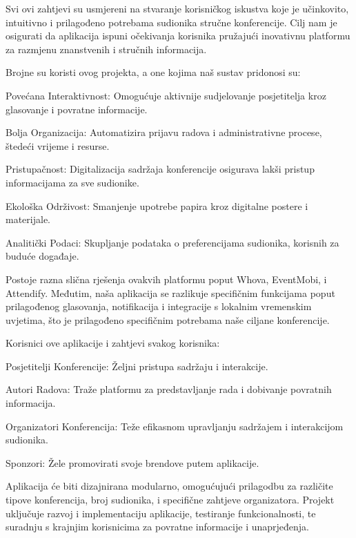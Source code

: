 		Svi ovi zahtjevi su usmjereni na stvaranje korisničkog iskustva koje je učinkovito, intuitivno i prilagođeno potrebama sudionika stručne konferencije. Cilj nam je osigurati da aplikacija ispuni očekivanja korisnika pružajući inovativnu platformu za razmjenu znanstvenih i stručnih informacija.
		
		Brojne su koristi ovog projekta, a one kojima naš sustav pridonosi su: 
		
		\begin{packed_item}
			\item Povećana Interaktivnost: Omogućuje aktivnije sudjelovanje posjetitelja kroz glasovanje i povratne informacije.
			\item Bolja Organizacija: Automatizira prijavu radova i administrativne procese, štedeći vrijeme i resurse.
			\item Pristupačnost: Digitalizacija sadržaja konferencije osigurava lakši pristup informacijama za sve sudionike.
			\item Ekološka Održivost: Smanjenje upotrebe papira kroz digitalne postere i materijale.
			\item Analitički Podaci: Skupljanje podataka o preferencijama sudionika, korisnih za buduće događaje.
		\end{packed_item}

		Postoje razna slična rješenja ovakvih platformu poput Whova, EventMobi, i Attendify. Međutim, naša aplikacija se razlikuje specifičnim funkcijama poput prilagođenog glasovanja, notifikacija i integracije s lokalnim vremenskim uvjetima, što je prilagođeno specifičnim potrebama naše ciljane konferencije.
		
		Korisnici ove aplikacije i zahtjevi svakog korisnika:
		\begin{packed_item}
			\item Posjetitelji Konferencije: Željni pristupa sadržaju i interakcije.
			\item Autori Radova: Traže platformu za predstavljanje rada i dobivanje povratnih informacija.
			\item Organizatori Konferencija: Teže efikasnom upravljanju sadržajem i interakcijom sudionika.
			\item Sponzori: Žele promovirati svoje brendove putem aplikacije.
		\end{packed_item}
		Aplikacija će biti dizajnirana modularno, omogućujući prilagodbu za različite tipove konferencija, broj sudionika, i specifične zahtjeve organizatora. Projekt uključuje razvoj i implementaciju aplikacije, testiranje funkcionalnosti, te suradnju s krajnjim korisnicima za povratne informacije i unaprjeđenja.
		
